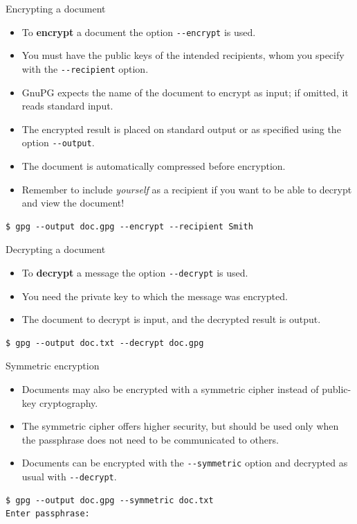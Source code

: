 \documentclass[
mode=present,
paper=smartboard,
size=20pt,
]{powerdot}
\newcommand\vsp{\vspace{-16mm}}
\newcommand{\clopt}[1]{\texttt{{-}#1}}
\begin{document}
\begin{slide}[method=direct]{Encrypting a document}
  \begin{itemize}
  \item To \textbf{encrypt} a document the option \clopt{-encrypt} is
    used.
  \item You must have the public keys of the intended recipients, whom
    you specify with the \clopt{-recipient} option.
  \item GnuPG expects the name of the document to encrypt as input; if
    omitted, it reads standard input.
  \item The encrypted result is placed on standard output or as
    specified using the option \clopt{-output}.
  \item The document is automatically compressed before encryption.
  \item Remember to include \emph{yourself} as a recipient if you want
    to be able to decrypt and view the document!
  \end{itemize}
\vsp
\begin{verbatim}
$ gpg --output doc.gpg --encrypt --recipient Smith
\end{verbatim}
\end{slide}

\begin{slide}[method=direct]{Decrypting a document}
  \begin{itemize}
  \item To \textbf{decrypt} a message the option \clopt{-decrypt} is used.
  \item You need the private key to which the message was encrypted.
  \item The document to decrypt is input, and the decrypted result is
    output.
  \end{itemize}
\begin{verbatim}
$ gpg --output doc.txt --decrypt doc.gpg
\end{verbatim}
\end{slide}

\begin{slide}[method=direct]{Symmetric encryption}
  \begin{itemize}
  \item Documents may also be encrypted with a symmetric cipher
    instead of public-key cryptography.
  \item The symmetric cipher offers higher security, but should be
    used only when the passphrase does not need to be communicated to
    others.
  \item Documents can be encrypted with the \clopt{-symmetric} option
    and decrypted as usual with \clopt{-decrypt}.
  \end{itemize}
\begin{verbatim}
$ gpg --output doc.gpg --symmetric doc.txt
Enter passphrase:
\end{verbatim}
\end{slide}
\end{document}

